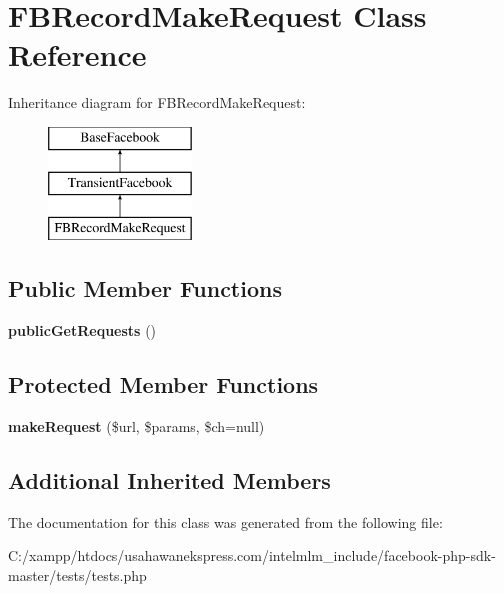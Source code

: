 \hypertarget{class_f_b_record_make_request}{\section{F\-B\-Record\-Make\-Request Class Reference}
\label{class_f_b_record_make_request}
}
Inheritance diagram for F\-B\-Record\-Make\-Request\-:\begin{figure}[H]
\begin{center}
\leavevmode
\includegraphics[height=3.000000cm]{class_f_b_record_make_request}
\end{center}
\end{figure}
\subsection*{Public Member Functions}
\begin{DoxyCompactItemize}
\item 
\hypertarget{class_f_b_record_make_request_a4d932f826f9bb52551ccdc4c02f831f5}{{\bfseries public\-Get\-Requests} ()}\label{class_f_b_record_make_request_a4d932f826f9bb52551ccdc4c02f831f5}

\end{DoxyCompactItemize}
\subsection*{Protected Member Functions}
\begin{DoxyCompactItemize}
\item 
\hypertarget{class_f_b_record_make_request_a43349b0f9d884f1357591ab9683ea651}{{\bfseries make\-Request} (\$url, \$params, \$ch=null)}\label{class_f_b_record_make_request_a43349b0f9d884f1357591ab9683ea651}

\end{DoxyCompactItemize}
\subsection*{Additional Inherited Members}


The documentation for this class was generated from the following file\-:\begin{DoxyCompactItemize}
\item 
C\-:/xampp/htdocs/usahawanekspress.\-com/intelmlm\-\_\-include/facebook-\/php-\/sdk-\/master/tests/tests.\-php\end{DoxyCompactItemize}

